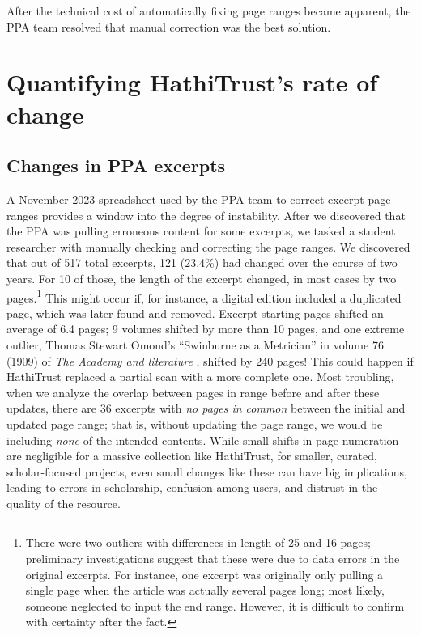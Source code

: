 \documentclass[final]{anthology-ch} %
\begin{document}
After the technical cost of automatically fixing page ranges became apparent, the PPA team resolved that manual correction was the best solution.

\section{Quantifying HathiTrust's rate of change}

\subsection{Changes in PPA excerpts}

A November 2023 spreadsheet used by the PPA team to correct excerpt page ranges provides a window into the degree of instability. After we discovered that the PPA was pulling erroneous content for some excerpts, we tasked a student researcher with manually checking and correcting the page ranges. We discovered that out of 517 total excerpts, 121 (23.4\%) had changed over the course of two years. For 10 of those, the length of the excerpt changed, in most cases by two pages.\footnote{There were two outliers with differences in length of 25 and 16 pages; preliminary investigations suggest that these were due to data errors in the original excerpts. For instance, one excerpt was originally only pulling a single page when the article was actually several pages long; most likely, someone neglected to input the end range. However, it is difficult to confirm with certainty after the fact.} This might occur if, for instance, a digital edition included a duplicated page, which was later found and removed. Excerpt starting pages shifted an average of 6.4 pages; 9 volumes shifted by more than 10 pages, and one extreme outlier, Thomas Stewart Omond's ``Swinburne as a Metrician'' in volume 76 (1909) of \textit{The Academy and literature} \cite{omond_thomas_stewart_swinburne_1909}, shifted by 240 pages! This could happen if HathiTrust replaced a partial scan with a more complete one. Most troubling, when we analyze the overlap between pages in range before and after these updates, there are 36 excerpts with \textit{no pages in common} between the initial and updated page range; that is, without updating the page range, we would be including \textit{none} of the intended contents. While small shifts in page numeration are negligible for a massive collection like HathiTrust, for smaller, curated, scholar-focused projects, even small changes like these can have big implications, leading to errors in scholarship, confusion among users, and distrust in the quality of the resource.
\end{document}
